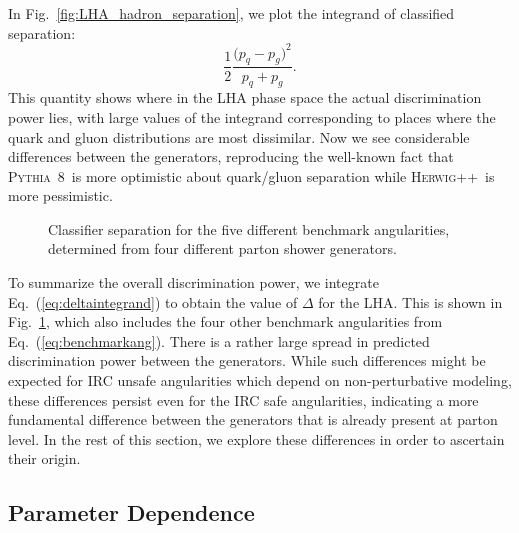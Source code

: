 \documentclass[11pt,letterpaper]{article}
\newcommand{\pythia}{\textsc{Pythia~8}\xspace}
\newcommand{\herwig}{\textsc{Herwig++}\xspace}
\DeclareRobustCommand{\Fig}[1]{Fig.~\ref{#1}}
\DeclareRobustCommand{\Eq}[1]{Eq.~(\ref{#1})}
\newcommand{\be}{\begin{equation}}
\newcommand{\ee}{\end{equation}}
\begin{document}
In \Fig{fig:LHA_hadron_separation}, we plot the integrand of classified separation:
\be
\label{eq:deltaintegrand}
\frac{1}{2} \frac{\bigl(p_q - p_g\bigr)^2}{p_q + p_g}.
\ee
This quantity shows where in the LHA phase space the actual discrimination power lies, with large values of the integrand corresponding to places where the quark and gluon distributions are most dissimilar.  Now we see considerable differences between the generators, reproducing the well-known fact that \pythia\ is more optimistic about quark/gluon separation while \herwig\ is more pessimistic.

\begin{figure}
\centering
{}
\caption{Classifier separation for the five different benchmark angularities, determined from four different parton shower generators.}
\label{fig:summary_hadron_all}
\end{figure}

To summarize the overall discrimination power, we integrate \Eq{eq:deltaintegrand} to obtain the value of $\Delta$ for the LHA.  This is shown in \Fig{fig:summary_hadron_all}, which also includes the four other benchmark angularities from \Eq{eq:benchmarkang}.  There is a rather large spread in predicted discrimination power between the generators.  While such differences might be expected for IRC unsafe angularities which depend on non-perturbative modeling, these differences persist even for the IRC safe angularities, indicating a more fundamental difference between the generators that is already present at parton level.  In the rest of this section, we explore these differences in order to ascertain their origin.

\subsection{Parameter Dependence}
\label{sec:ee_scales}
\end{document}
